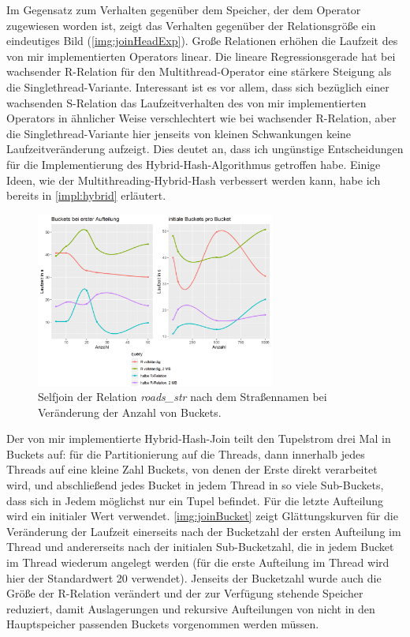 \documentclass[a4paper,12pt,twoside]{article}
\newcommand{\Fb}[1]{\textit{#1}} %
\begin{document}
Im Gegensatz zum Verhalten gegenüber dem Speicher, der dem Operator zugewiesen worden ist, zeigt das Verhalten gegenüber der Relationsgröße ein eindeutiges Bild (\autoref{img:joinHeadExp}). Große Relationen erhöhen die Laufzeit des von mir implementierten Operators linear. Die lineare Regressionsgerade hat bei wachsender R-Relation für den Multithread-Operator eine stärkere Steigung als die Singlethread-Variante. Interessant ist es vor allem, dass sich bezüglich einer wachsenden S-Relation das Laufzeitverhalten des von mir implementierten Operators in ähnlicher Weise verschlechtert wie bei wachsender R-Relation, aber die Singlethread-Variante hier jenseits von kleinen Schwankungen keine Laufzeitveränderung aufzeigt. Dies deutet an, dass ich ungünstige Entscheidungen für die Implementierung des Hybrid-Hash-Algorithmus getroffen habe. Einige Ideen, wie der Multithreading-Hybrid-Hash verbessert werden kann, habe ich bereits in \autoref{impl:hybrid} erläutert.   

\begin{figure}
	\centering
	\includegraphics[width=0.70\textwidth]{Bilder/join_bucket.png}
	\caption{Selfjoin der Relation \Fb{roads\_str} nach dem Straßennamen bei Veränderung der Anzahl von Buckets.}
	\label{img:joinBucket}
\end{figure}

Der von mir implementierte Hybrid-Hash-Join teilt den Tupelstrom drei Mal in Buckets auf: für die Partitionierung auf die Threads, dann innerhalb jedes Threads auf eine kleine Zahl Buckets, von denen der Erste direkt verarbeitet wird, und abschließend jedes Bucket in jedem Thread in so viele Sub-Buckets, dass sich in Jedem möglichst nur ein Tupel befindet. Für die letzte Aufteilung wird ein initialer Wert verwendet. \autoref{img:joinBucket} zeigt Glättungskurven für die Veränderung der Laufzeit einerseits nach der Bucketzahl der ersten Aufteilung im Thread und andererseits nach der initialen Sub-Bucketzahl, die in jedem Bucket im Thread wiederum angelegt werden (für die erste Aufteilung im Thread wird hier der Standardwert 20 verwendet). Jenseits der Bucketzahl wurde auch die Größe der R-Relation verändert und der zur Verfügung stehende Speicher reduziert, damit Auslagerungen und rekursive Aufteilungen von nicht in den Hauptspeicher passenden Buckets vorgenommen werden müssen.
\end{document}
